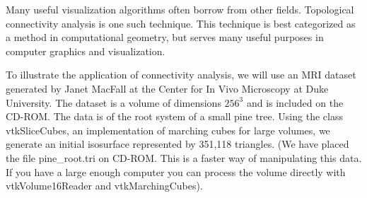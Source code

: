 Many useful visualization algorithms often borrow from other fields. Topological connectivity analysis is one such technique. This technique is best categorized as a method in computational geometry, but serves many useful purposes in computer graphics and visualization.

To illustrate the application of connectivity analysis, we will use an MRI dataset generated by Janet MacFall at the Center for In Vivo Microscopy at Duke University. The dataset is a volume of dimensions $256^3$ and is included on the CD-ROM. The data is of the root system of a small pine tree. Using the class vtkSliceCubes, an implementation of marching cubes for large volumes, we generate an initial isosurface represented by 351,118 triangles. (We have placed the file pine\_root.tri on CD-ROM. This is a faster way of manipulating this data. If you have a large enough computer you can process the volume directly with vtkVolume16Reader and vtkMarchingCubes).

